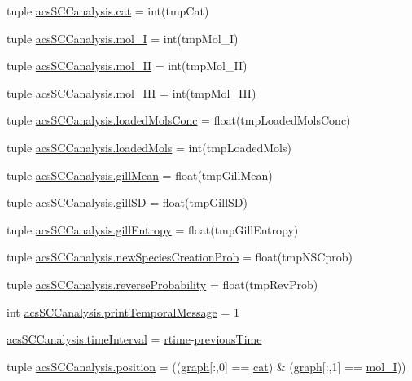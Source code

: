 \begin{DoxyCompactItemize}
\item 
tuple \hyperlink{a00096_aea872e34fe0da6302f6195f1b2315148}{acs\-S\-C\-Canalysis.\-cat} = int(tmp\-Cat)
\item 
tuple \hyperlink{a00096_ae13d6607ffa236891a9af05bfa88cfcc}{acs\-S\-C\-Canalysis.\-mol\-\_\-\-I} = int(tmp\-Mol\-\_\-\-I)
\item 
tuple \hyperlink{a00096_a8f2878f5909e4aeb9155a1103eaba413}{acs\-S\-C\-Canalysis.\-mol\-\_\-\-I\-I} = int(tmp\-Mol\-\_\-\-I\-I)
\item 
tuple \hyperlink{a00096_a20047e8516f386a7e98ffa0efec09471}{acs\-S\-C\-Canalysis.\-mol\-\_\-\-I\-I\-I} = int(tmp\-Mol\-\_\-\-I\-I\-I)
\item 
tuple \hyperlink{a00096_abe83f5e0ae3bd65da15a697a979aeea1}{acs\-S\-C\-Canalysis.\-loaded\-Mols\-Conc} = float(tmp\-Loaded\-Mols\-Conc)
\item 
tuple \hyperlink{a00096_ab4566d46d368eb4f93ff6db5191648bd}{acs\-S\-C\-Canalysis.\-loaded\-Mols} = int(tmp\-Loaded\-Mols)
\item 
tuple \hyperlink{a00096_a4e862896701636d17752f14810ff687f}{acs\-S\-C\-Canalysis.\-gill\-Mean} = float(tmp\-Gill\-Mean)
\item 
tuple \hyperlink{a00096_acdb3e72aea08c29494799fd08763b406}{acs\-S\-C\-Canalysis.\-gill\-S\-D} = float(tmp\-Gill\-S\-D)
\item 
tuple \hyperlink{a00096_a4c214eb4f6812d6182bae32715bce3ad}{acs\-S\-C\-Canalysis.\-gill\-Entropy} = float(tmp\-Gill\-Entropy)
\item 
tuple \hyperlink{a00096_a47b24df6e487f6dd90158dde93cc7c93}{acs\-S\-C\-Canalysis.\-new\-Species\-Creation\-Prob} = float(tmp\-N\-S\-Cprob)
\item 
tuple \hyperlink{a00096_aa7db2dba66810044f9c5238eccc995b7}{acs\-S\-C\-Canalysis.\-reverse\-Probability} = float(tmp\-Rev\-Prob)
\item 
int \hyperlink{a00096_a3de1ee32e24403b152d565d8c52cf7fd}{acs\-S\-C\-Canalysis.\-print\-Temporal\-Message} = 1
\item 
\hyperlink{a00096_a7d0f86310c439e970e0b41121364027c}{acs\-S\-C\-Canalysis.\-time\-Interval} = \hyperlink{a00022_afc6b38657a313b9f1de2ee356910b6ee}{rtime}-\/\hyperlink{a00022_a17b8652a085b5add031a40fb1c9a680e}{previous\-Time}
\item 
tuple \hyperlink{a00096_ac09e85f8df5b7c8c7d2caf87e9193421}{acs\-S\-C\-Canalysis.\-position} = ((\hyperlink{a00022_a2745e24fec2a44d51f4452beb1596bd3}{graph}\mbox{[}\-:,0\mbox{]} == \hyperlink{a00022_a7073f71a43389f3032e69b1fffc2551a}{cat}) \& (\hyperlink{a00022_a2745e24fec2a44d51f4452beb1596bd3}{graph}\mbox{[}\-:,1\mbox{]} == \hyperlink{a00022_ab346189eef5359a07ba32144ddcd4465}{mol\-\_\-\-I}))

\end{DoxyCompactItemize}
